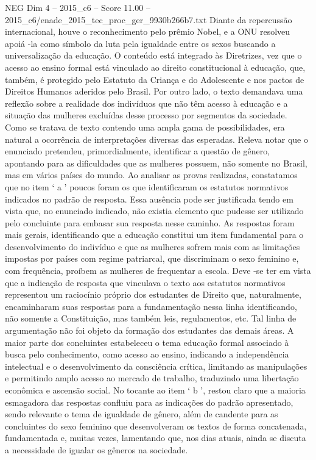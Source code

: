 \begin{textsample}{NEG Dim 4 – 2015\_c6 – Score 11.00 – 2015\_c6/enade\_2015\_tec\_proc\_ger\_9930b266b7.txt}
Diante da repercussão internacional, houve o reconhecimento pelo prêmio Nobel, e a ONU resolveu apoiá -la como símbolo da luta pela igualdade entre os sexos buscando a universalização da educação.
O conteúdo está integrado às Diretrizes, vez que o acesso ao ensino formal está vinculado ao direito constitucional à educação, que, também, é protegido pelo Estatuto da Criança e do Adolescente e nos pactos de Direitos Humanos aderidos pelo Brasil.
Por outro lado, o texto demandava uma reflexão sobre a realidade dos indivíduos que não têm acesso à educação e a situação das mulheres excluídas desse processo por segmentos da sociedade.
Como se tratava de texto contendo uma ampla gama de possibilidades, era natural a ocorrência de interpretações diversas das esperadas.
Releva notar que o enunciado pretendeu, primordialmente, identificar a questão de gênero, apontando para as dificuldades que as mulheres possuem, não somente no Brasil, mas em vários países do mundo.
Ao analisar as provas realizadas, constatamos que no item ‘ a ’ poucos foram os que identificaram os estatutos normativos indicados no padrão de resposta.
Essa ausência pode ser justificada tendo em vista que, no enunciado indicado, não existia elemento que pudesse ser utilizado pelo concluinte para embasar sua resposta nesse caminho.
As respostas foram mais gerais, identificando que a educação constitui um item fundamental para o desenvolvimento do indivíduo e que as mulheres sofrem mais com as limitações impostas por países com regime patriarcal, que discriminam o sexo feminino e, com frequência, proíbem as mulheres de frequentar a escola.
Deve -se ter em vista que a indicação de resposta que vinculava o texto aos estatutos normativos representou um raciocínio próprio dos estudantes de Direito que, naturalmente, encaminharam suas respostas para a fundamentação nessa linha identificando, não somente a Constituição, mas também leis, regulamentos, etc.
Tal linha de argumentação não foi objeto da formação dos estudantes das demais áreas.
A maior parte dos concluintes estabeleceu o tema educação formal associado à busca pelo conhecimento, como acesso ao ensino, indicando a independência intelectual e o desenvolvimento da consciência crítica, limitando as manipulações e permitindo amplo acesso ao mercado de trabalho, traduzindo uma libertação econômica e ascensão social.
No tocante ao item ‘ b ’, restou claro que a maioria esmagadora das respostas confluiu para as indicações do padrão apresentado, sendo relevante o tema de igualdade de gênero, além de candente para as concluintes do sexo feminino que desenvolveram os textos de forma concatenada, fundamentada e, muitas vezes, lamentando que, nos dias atuais, ainda se discuta a necessidade de igualar os gêneros na sociedade.

\end{textsample}
